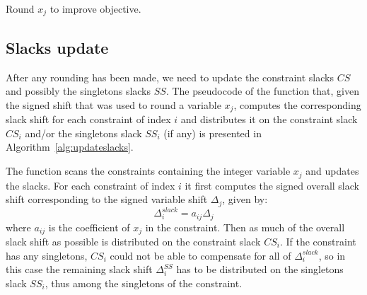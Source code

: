 \documentclass[a4paper,12pt,twoside]{scrbook}
\begin{document}
\begin{algorithm}[ht]

	\caption{Round $x_j$ to improve objective.}
	\label{alg:roundxjbestobj}
\end{algorithm}

\subsection{Slacks update}
After any rounding has been made, we need to update the constraint slacks $CS$ and possibly the singletons slacks $SS$. The pseudocode of the function that, given the signed shift that was used to round a variable $x_j$, computes the corresponding slack shift for each constraint of index $i$ and distributes it on the constraint slack $CS_i$ and/or the singletons slack $SS_i$ (if any) is presented in Algorithm~\ref{alg:updateslacks}. \par
The function scans the constraints containing the integer variable $x_j$ and updates the slacks. For each constraint of index $i$ it first computes the signed overall slack shift corresponding to the signed variable shift $\Delta_{j}$, given by:
\begin{equation}
	\Delta_{i}^{slack} = a_{ij} \Delta_{j}
\end{equation}
where $a_{ij}$ is the coefficient of $x_j$ in the constraint. Then as much of the overall slack shift as possible is distributed on the constraint slack $CS_i$. If the constraint has any singletons, $CS_i$ could not be able to compensate for all of $\Delta_{i}^{slack}$, so in this case the remaining slack shift $\Delta_{i}^{SS}$ has to be distributed on the singletons slack $SS_i$, thus among the singletons of the constraint. \par
\end{document}
